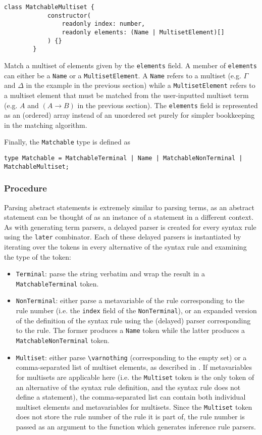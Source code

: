 \begin{itemize}
\begin{lstlisting}[style=ds]
        class MatchableMultiset {
            constructor(
                readonly index: number,
                readonly elements: (Name | MultisetElement)[]
            ) {}
        }
    \end{lstlisting}
    Match a multiset of elements given by the \lstinline{elements} field. A member of \lstinline{elements} can either be a \lstinline{Name} or a \lstinline{MultisetElement}. A \lstinline{Name} refers to a multiset (e.g. $\Gamma$ and $\Delta$ in the example in the previous section) while a \lstinline{MultisetElement} refers to a multiset element that must be matched from the user-inputted multiset term (e.g. $A$ and $(A \to B)$ in the previous section). The \lstinline{elements} field is represented as an (ordered) array instead of an unordered set purely for simpler bookkeeping in the matching algorithm.
\end{itemize}
Finally, the \lstinline{Matchable} type is defined as
\begin{center}
    \lstinline{type Matchable = MatchableTerminal | Name | MatchableNonTerminal | MatchableMultiset;}
\end{center}
\subsubsection{Procedure}
Parsing abstract statements is extremely similar to parsing terms, as an abstract statement can be thought of as an instance of a statement in a different context. As with generating term parsers, a delayed parser is created  for every syntax rule using the \lstinline{later} combinator. Each of these delayed parsers is instantiated by iterating over the tokens in every alternative of the syntax rule and examining the type of the token:
\begin{itemize}
    \item \lstinline{Terminal}: parse the string verbatim and wrap the result in a \lstinline{MatchableTerminal} token.
    \item \lstinline{NonTerminal}: either parse a metavariable of the rule corresponding to the rule number (i.e. the \lstinline{index} field of the \lstinline{NonTerminal}), or an expanded version of the definition of the syntax rule using the (delayed) parser corresponding to the rule. The former produces a \lstinline{Name} token while the latter produces a \lstinline{MatchableNonTerminal} token.
    \item \lstinline{Multiset}: either parse \lstinline{\varnothing} (corresponding to the empty set) or a comma-separated list of multiset elements, as described in . If metavariables for multisets are applicable here (i.e. the \lstinline{Multiset} token is the only token of an alternative of the syntax rule definition, and the syntax rule does not define a statement), the comma-separated list can contain both individual multiset elements and metavariables for multisets. Since the \lstinline{Multiset} token does not store the rule number of the rule it is part of, the rule number is passed as an argument to the function which generates inference rule parsers.
\end{itemize}